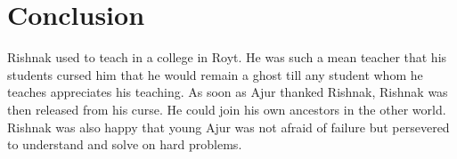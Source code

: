 \chapter{Conclusion}
 Rishnak used to teach in a college in Royt. He was such a mean 
teacher that his students cursed him that he would remain a ghost till any student whom he teaches 
appreciates his teaching. As soon as Ajur thanked Rishnak, Rishnak was then released from his curse. He could join his own ancestors in the other world. Rishnak was also happy that young Ajur was not afraid of failure but persevered to understand and solve on hard problems.
